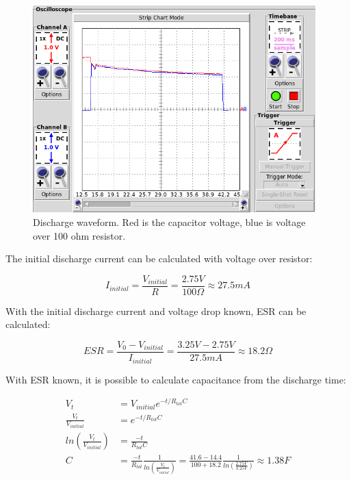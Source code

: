 \begin{figure}[htb]
\begin{center}
\includegraphics[height=8cm]{images/own_measurement/circuit/discharge.png}
\end{center}
\caption{\label{fig:scap_discharge} Discharge waveform. Red is the capacitor voltage, blue is voltage over 100 ohm resistor.}
\end{figure}

The initial discharge current can be calculated with voltage over resistor:

\begin{equation}
  I_{initial} = \frac{V_{initial}}{R} = \frac{2.75 V}{100 \Omega} \approx 27.5 mA 
\end{equation}

With the initial discharge current and voltage drop known, ESR can be calculated:

\begin{equation}
  ESR = \frac{V_{0} - V_{initial}}{I_{initial}} = \frac{3.25 V - 2.75 V}{27.5 mA} \approx 18.2 \Omega
\end{equation}

With ESR known, it is possible to calculate capacitance from the discharge time:

\begin{equation}
\begin{split}
  V_t                            &= V_{initial}e^{-t/R_{tot}C} \\
  \frac{V_t}{V_{initial}}                &= e^{-t/R_{tot}C} \\
  ln\left(\frac{V_t}{V_{initial}}\right) &= \frac{-t}{R_{tot}C} \\
  C                              &= \frac{-t}{R_{tot}} \frac{1}{ ln\left(\frac{V_t}{V_{initial}}\right)} = \frac{41.6-14.4}{100 + 18.2} \frac{1}{ ln\left(\frac{2.75 V}{3.25 V}\right)} \approx 1.38 F
\end{split}
\end{equation}

